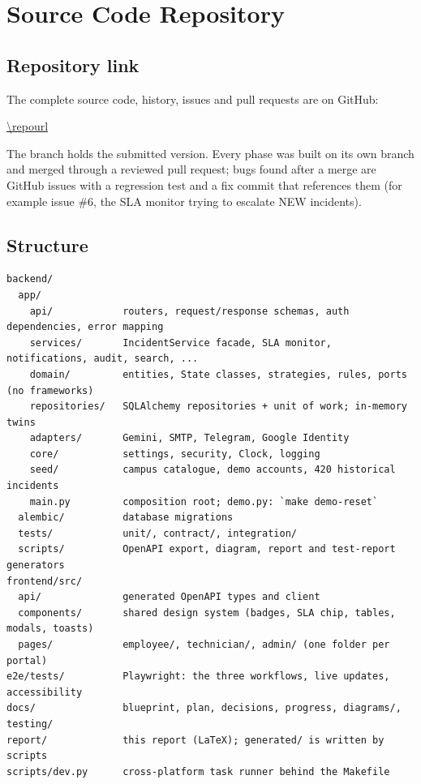 \chapter{Source Code Repository}\label{ch:repository}

\section{Repository link}
The complete source code, history, issues and pull requests are on GitHub:
\begin{center}\url{\repourl}\end{center}
The  branch holds the submitted version. Every phase was built on its own branch and
merged through a reviewed pull request; bugs found after a merge are GitHub issues with a
regression test and a fix commit that references them (for example issue \#6, the SLA monitor
trying to escalate NEW incidents).

\section{Structure}
\begin{lstlisting}[basicstyle=\ttfamily\small,columns=fullflexible]
backend/
  app/
    api/            routers, request/response schemas, auth dependencies, error mapping
    services/       IncidentService facade, SLA monitor, notifications, audit, search, ...
    domain/         entities, State classes, strategies, rules, ports (no frameworks)
    repositories/   SQLAlchemy repositories + unit of work; in-memory twins
    adapters/       Gemini, SMTP, Telegram, Google Identity
    core/           settings, security, Clock, logging
    seed/           campus catalogue, demo accounts, 420 historical incidents
    main.py         composition root; demo.py: `make demo-reset`
  alembic/          database migrations
  tests/            unit/, contract/, integration/
  scripts/          OpenAPI export, diagram, report and test-report generators
frontend/src/
  api/              generated OpenAPI types and client
  components/       shared design system (badges, SLA chip, tables, modals, toasts)
  pages/            employee/, technician/, admin/ (one folder per portal)
e2e/tests/          Playwright: the three workflows, live updates, accessibility
docs/               blueprint, plan, decisions, progress, diagrams/, testing/
report/             this report (LaTeX); generated/ is written by scripts
scripts/dev.py      cross-platform task runner behind the Makefile
\end{lstlisting}

